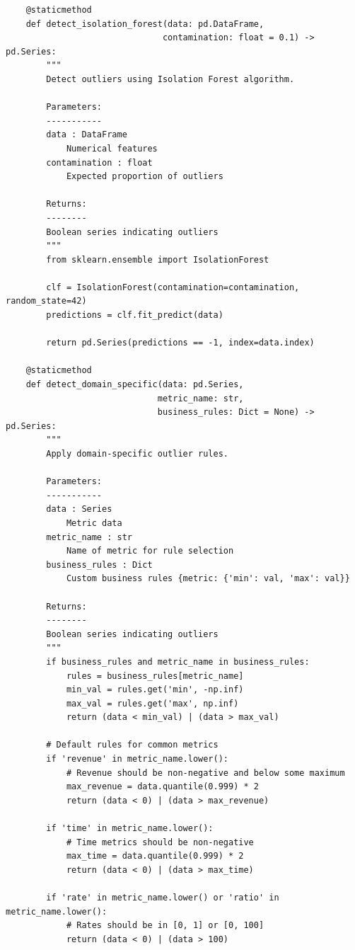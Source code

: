 \begin{lstlisting}
    @staticmethod
    def detect_isolation_forest(data: pd.DataFrame,
                               contamination: float = 0.1) -> pd.Series:
        """
        Detect outliers using Isolation Forest algorithm.

        Parameters:
        -----------
        data : DataFrame
            Numerical features
        contamination : float
            Expected proportion of outliers

        Returns:
        --------
        Boolean series indicating outliers
        """
        from sklearn.ensemble import IsolationForest

        clf = IsolationForest(contamination=contamination, random_state=42)
        predictions = clf.fit_predict(data)

        return pd.Series(predictions == -1, index=data.index)

    @staticmethod
    def detect_domain_specific(data: pd.Series,
                              metric_name: str,
                              business_rules: Dict = None) -> pd.Series:
        """
        Apply domain-specific outlier rules.

        Parameters:
        -----------
        data : Series
            Metric data
        metric_name : str
            Name of metric for rule selection
        business_rules : Dict
            Custom business rules {metric: {'min': val, 'max': val}}

        Returns:
        --------
        Boolean series indicating outliers
        """
        if business_rules and metric_name in business_rules:
            rules = business_rules[metric_name]
            min_val = rules.get('min', -np.inf)
            max_val = rules.get('max', np.inf)
            return (data < min_val) | (data > max_val)

        # Default rules for common metrics
        if 'revenue' in metric_name.lower():
            # Revenue should be non-negative and below some maximum
            max_revenue = data.quantile(0.999) * 2
            return (data < 0) | (data > max_revenue)

        if 'time' in metric_name.lower():
            # Time metrics should be non-negative
            max_time = data.quantile(0.999) * 2
            return (data < 0) | (data > max_time)

        if 'rate' in metric_name.lower() or 'ratio' in metric_name.lower():
            # Rates should be in [0, 1] or [0, 100]
            return (data < 0) | (data > 100)


\end{lstlisting}
